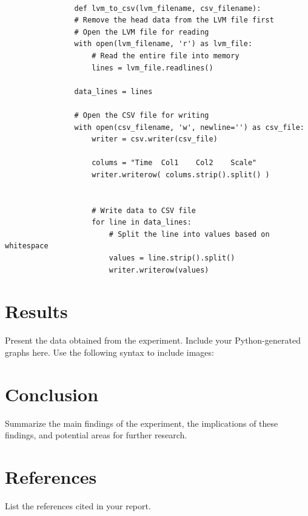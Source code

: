 \documentclass[12pt]{article}
\begin{document}
            \lstset{language=Python}
            \lstset{frame=lines}
            \lstset{basicstyle=\footnotesize}
            \begin{lstlisting}

                def lvm_to_csv(lvm_filename, csv_filename):
                # Remove the head data from the LVM file first
                # Open the LVM file for reading
                with open(lvm_filename, 'r') as lvm_file:
                    # Read the entire file into memory
                    lines = lvm_file.readlines()
            
                data_lines = lines
            
                # Open the CSV file for writing
                with open(csv_filename, 'w', newline='') as csv_file:
                    writer = csv.writer(csv_file)
                    
                    colums = "Time	Col1	Col2	Scale"
                    writer.writerow( colums.strip().split() )
                    
                    
                    # Write data to CSV file
                    for line in data_lines:
                        # Split the line into values based on whitespace
                        values = line.strip().split()
                        writer.writerow(values)
            \end{lstlisting}
                

\section{Results}
    Present the data obtained from the experiment. Include your Python-generated graphs here. Use the following syntax to include images:
    

\section{Conclusion}
    Summarize the main findings of the experiment, the implications of these findings, and potential areas for further research.

\section{References}
    List the references cited in your report.
\end{document}
